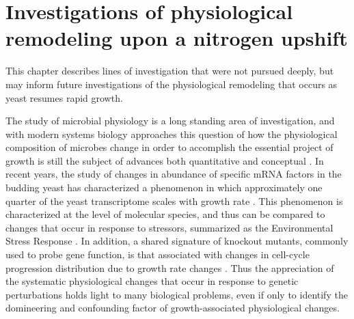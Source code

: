 \chapter{Investigations of physiological remodeling upon a nitrogen 
upshift}

This chapter describes lines of investigation that were not
pursued deeply, but may inform future investigations of the
physiological remodeling that occurs as yeast resumes rapid
growth.

The study of microbial physiology is a long standing area of
investigation, and with modern systems biology approaches this
question of how the physiological composition of microbes change in
order to accomplish the essential project of growth is still the
subject of advances both quantitative and conceptual 
\parencite{slator1918some,henrici1928morphologic,schaechter1958dependency,kjeldgaard1958transition,wehr1969macromolecular,waldron1977synthesis,carter1978protein,waldron1975effect,kief1981coordinate,scott2010interdependence,erickson2017global,kafri2016cost,metzl2017principles}.
In recent years, the study of changes in abundance of specific mRNA
factors in the budding yeast has characterized a phenomenon in which
approximately one quarter of the yeast transcriptome scales with
growth rate \parencite{brauer2008coordination,airoldi2009predicting}.
This phenomenon is characterized at the level of molecular species,
and thus can be compared to changes that occur in response to
stressors, summarized as the Environmental Stress Response 
\parencite{gasch2000genomic}. 
In addition, a shared signature of knockout mutants, commonly used to
probe gene function, is that associated with changes in cell-cycle
progression distribution due to growth rate changes
\parencite{o2014cell}.
Thus the appreciation of the systematic physiological changes that
occur in response to genetic perturbations holds light to many
biological problems, even if only to identify the domineering and 
confounding factor of growth-associated physiological changes.

